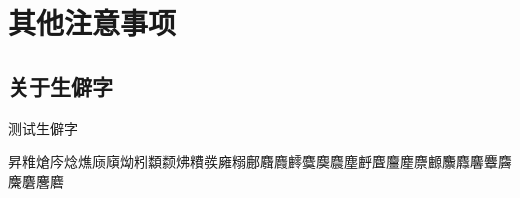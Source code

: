 \chapter{其他注意事项}

\section{关于生僻字}

测试生僻字

昇䊒熗庈焾燋庼廎㶭粌纇颣炥䊧彂㢕糑鄜麛麚䴫麌䴠麎塵䴣麆麠䴤麖䴨䴩䴪麘麞麡麍麏麐麔	




\label{cha:method}
